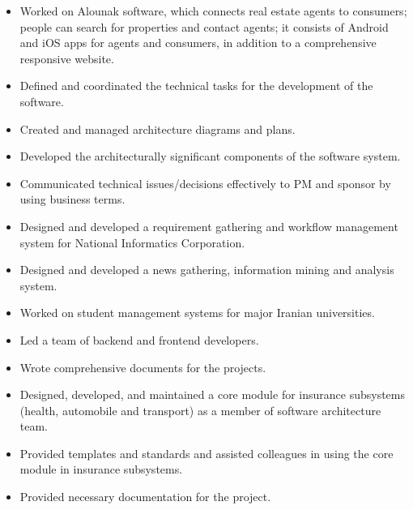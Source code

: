 \documentclass[10pt,a4paper,ragged2e]{altacv}
\begin{document}
    \begin{itemize}
        \item
        {Worked on Alounak software, which connects real estate agents to consumers; people can search for properties and contact agents; it consists of Android and iOS apps for agents and consumers, in addition to a comprehensive responsive website.}
        \item
        {Defined and coordinated the technical tasks for the development of the software.}
        \item
        {Created and managed architecture diagrams and plans.}
        \item
        {Developed the architecturally significant components of the software system.}
        \item
        {Communicated technical issues/decisions effectively to PM and sponsor by using business terms.}
    \end{itemize}

    \divider

    \begin{itemize}
        \item
        {Designed and developed a requirement gathering and workflow management system for National Informatics Corporation.}
        \item
        {Designed and developed a news gathering, information mining and analysis system.}
        \item
        {Worked on student management systems for major Iranian universities.}
        \item
        {Led a team of backend and frontend developers.}
        \item
        {Wrote comprehensive documents for the projects.}
    \end{itemize}

    \divider

    \begin{itemize}
        \item
        {Designed, developed, and maintained a core module for insurance subsystems (health, automobile and transport) as a member of software architecture team.}
        \item
        {Provided templates and standards and assisted colleagues in using the core module in insurance subsystems.}
        \item
        {Provided necessary documentation for the project.}
    \end{itemize}
\end{document}
